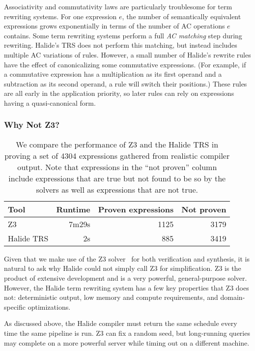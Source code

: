 Associativity and commutativity laws are particularly troublesome for term rewriting systems. 
For one expression $e$, the number of semantically equivalent expressions grows 
exponentially in terms of the number of AC operations $e$ contains. Some term rewriting 
systems perform a full \emph{AC matching} step during rewriting. Halide's TRS does not
perform this matching, but instead
includes multiple AC variations of rules.
However, a small number of Halide's rewrite rules have the effect of canonicalizing some commutative
expressions. (For example, if a commutative expression has a multiplication as its 
first operand and a subtraction as its second operand, a rule will switch their positions.)
These rules are all early in the application priority, so later rules can rely on
expressions having a quasi-canonical form.

\subsubsection{Why Not Z3?}
\begin{table}
\caption{We compare the performance of Z3 and the Halide TRS in proving a set of 4304 expressions gathered from realistic compiler output. Note that expressions in the ``not proven'' column include expressions that are true but not found to be so by the solvers as well as expressions that are not true. }
\centering
\begin{tabular}{l|r|r|r}
Tool & Runtime & Proven expressions & Not proven \\
\hline
Z3 & 7m29s & 1125 & 3179 \\
Halide TRS & 2s & 885 & 3419 
\end{tabular}
\label{tab:simplifiervsz3}
\end{table}


Given that we make use of the Z3 solver~\cite{de2008z3} for both verification and synthesis, it is natural to ask why Halide could not simply call Z3 for simplification. Z3 is the product of extensive development and is a very powerful, general-purpose solver. However, the Halide term rewriting system has a few key properties that Z3 does not: deterministic output, low memory and compute requirements, and domain-specific optimizations.

As discussed above, the Halide compiler must return the same schedule every time the same pipeline is run. Z3 can fix a random seed, but long-running queries may complete on a more powerful server while timing out on a different machine.

